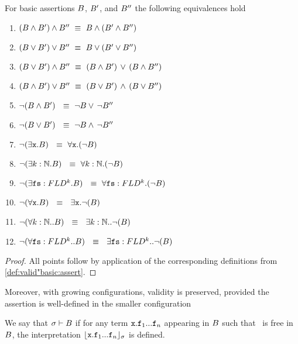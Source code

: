 \begin{lemma}
For   basic assertions $B$, $B'$, and $B''$ the following equivalences hold
\label{lemma:basic_assertions_classical}
\begin{enumerate}
\item
$(\SA \wedge \SAPrime) \wedge \SA'' \ \equiv \  \SA \wedge (\SAPrime \wedge \SA'')$
\item 
$(\SA \vee \SAPrime) \vee \SA'' \ \equiv \  \SA \vee (\SAPrime \vee\SA'')$
\item 
$(\SA \vee \SAPrime) \wedge \SA'' \ \equiv \  (\SA \wedge \SAPrime)\, \vee\, (\SA \wedge \SA'')$
\item 
$(\SA \wedge \SAPrime) \vee \SA'' \ \equiv \  (\SA \vee \SAPrime)\, \wedge\, (\SA \vee \SA'')$
\item 
$\neg (B \wedge B') \  \ \equiv \  \neg  B   \vee\, \neg B''$
\item 
$\neg (B \vee B') \  \ \equiv \  \neg  B   \wedge\, \neg B''$
\item
$\neg (\exists \prg{x}.\SA )  \  \ \equiv \  \forall \prg{x}.(\neg  \SA)$
\item
$\neg (\exists k:\mathbb{N}.\SA )  \  \ \equiv \  \forall  k:\mathbb{N}.(\neg  \SA)$
\item
$\neg (\exists {\mbox{\tt{fs}}}:FLD^k.B )  \  \ \equiv \  \forall {\mbox{\tt{fs}}}:FLD^k.(\neg  B)$
\item
$\neg (\forall \prg{x}. \SA)  \  \ \equiv \  \  \exists \prg{x}.\neg(\SA )$
\item
$\neg (\forall k:\mathbb{N}.. B)  \  \ \equiv \  \  \exists k:\mathbb{N}..\neg(B )$
\item
$\neg (\forall {\mbox{\tt{fs}}}:FLD^k.. B)  \  \ \equiv \  \  \exists {\mbox{\tt{fs}}}:FLD^k..\neg(B )$
\end{enumerate}
\end{lemma}
\begin{proof}
All points follow by application of the corresponding definitions from \ref{def:valid"basic:assert}.
 \end{proof}

Moreover, with growing configurations, validity is preserved, provided the assertion is well-defined in the smaller configuration

\begin{definition}
We say that $\sigma \vdash B$ if %
for any term ${\mbox{\tt{x}}}.{\mbox{\tt{f}}}_1...{\mbox{\tt{f}}}_n$ appearing in $B$ such that \x\, is free in $B$, the interpretation ${\lfloor{ {{\mbox{\tt{x}}}.{\mbox{\tt{f}}}_1...{\mbox{\tt{f}}}_n}}\rfloor_{\sigma}}$ is defined.
\end{definition}

